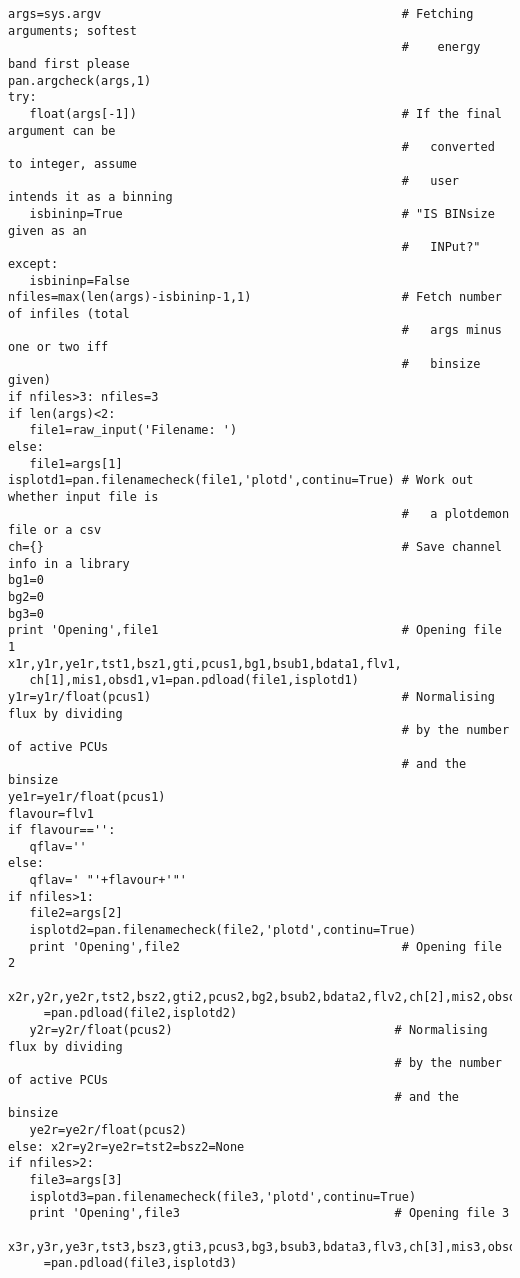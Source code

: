 \begin{verbatim}
args=sys.argv                                          # Fetching arguments; softest
                                                       #    energy band first please
pan.argcheck(args,1)
try:
   float(args[-1])                                     # If the final argument can be
                                                       #   converted to integer, assume
                                                       #   user intends it as a binning 
   isbininp=True                                       # "IS BINsize given as an
                                                       #   INPut?"
except:
   isbininp=False
nfiles=max(len(args)-isbininp-1,1)                     # Fetch number of infiles (total
                                                       #   args minus one or two iff
                                                       #   binsize given)
if nfiles>3: nfiles=3
if len(args)<2:
   file1=raw_input('Filename: ')
else:
   file1=args[1]
isplotd1=pan.filenamecheck(file1,'plotd',continu=True) # Work out whether input file is
                                                       #   a plotdemon file or a csv
ch={}                                                  # Save channel info in a library
bg1=0
bg2=0
bg3=0
print 'Opening',file1                                  # Opening file 1
x1r,y1r,ye1r,tst1,bsz1,gti,pcus1,bg1,bsub1,bdata1,flv1,
   ch[1],mis1,obsd1,v1=pan.pdload(file1,isplotd1)
y1r=y1r/float(pcus1)                                   # Normalising flux by dividing
                                                       # by the number of active PCUs
                                                       # and the binsize
ye1r=ye1r/float(pcus1)
flavour=flv1
if flavour=='':
   qflav=''
else:
   qflav=' "'+flavour+'"'
if nfiles>1:
   file2=args[2]
   isplotd2=pan.filenamecheck(file2,'plotd',continu=True)
   print 'Opening',file2                               # Opening file 2
   x2r,y2r,ye2r,tst2,bsz2,gti2,pcus2,bg2,bsub2,bdata2,flv2,ch[2],mis2,obsd2,v2\
     =pan.pdload(file2,isplotd2)
   y2r=y2r/float(pcus2)                               # Normalising flux by dividing
                                                      # by the number of active PCUs
                                                      # and the binsize
   ye2r=ye2r/float(pcus2)
else: x2r=y2r=ye2r=tst2=bsz2=None
if nfiles>2:
   file3=args[3]
   isplotd3=pan.filenamecheck(file3,'plotd',continu=True)
   print 'Opening',file3                              # Opening file 3
   x3r,y3r,ye3r,tst3,bsz3,gti3,pcus3,bg3,bsub3,bdata3,flv3,ch[3],mis3,obsd3,v3\
     =pan.pdload(file3,isplotd3)

\end{verbatim}

